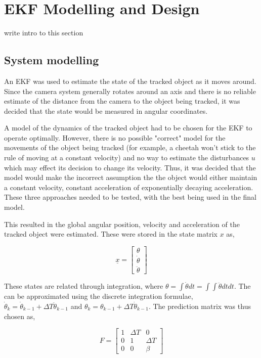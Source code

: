 \chapter{EKF Modelling and Design}

{\Large \color{red} write intro to this section}

\section{System modelling}
An EKF was used to estimate the state of the tracked object as it moves around. Since the camera system generally rotates around an axis and there is no reliable estimate of the distance from the camera to the object being tracked, it was decided that the state would be measured in angular coordinates.

A model of the dynamics of the tracked object had to be chosen for the EKF to operate optimally. However, there is no possible "correct" model for the movements of the object being tracked (for example, a cheetah won't stick to the rule of moving at a constant velocity) and no way to estimate the disturbances $u$ which may effect its decision to change its velocity. Thus, it was decided that the model would make the incorrect assumption the the object would either maintain a constant velocity, constant acceleration of exponentially decaying acceleration. These three approaches needed to be tested, with the best being used in the final model.

This resulted in the global angular position, velocity and acceleration of the tracked object were estimated. These were stored in the state matrix $x$ as,

\[ \underline{x} = \begin{bmatrix} \theta \\ \dot{\theta} \\ \ddot{\theta} \end{bmatrix} \]

These states are related through integration, where $\theta = \int{\dot{\theta} dt} = \int{\int{\ddot{\theta} dt}dt}$. The can be approximated using the discrete integration formulae, $\dot{\theta}_k = \dot{\theta}_{k-1} + \Delta T \ddot{\theta}_{k-1}$ and $\theta_k = \theta_{k-1} + \Delta T \dot{\theta}_{k-1}$. The prediction matrix was thus chosen as,

\[ F = \begin{bmatrix} 1 & \Delta T & 0 \\
                       0 & 1 & \Delta T \\
					   0 & 0 & \beta
		\end{bmatrix} \]

